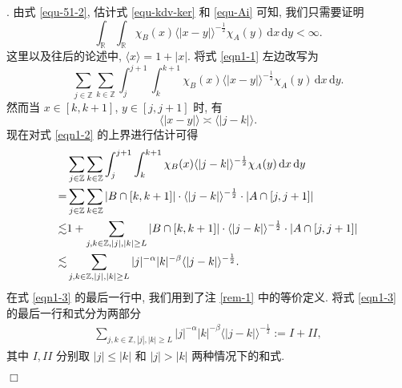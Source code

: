 \documentclass[master]{cugthesis}
\renewcommand\d{\ensuremath{\,\mathrm{d}}}
\newenvironment{proof}{{\noindent\itshape 证明}.}{\hfill $\Box$\par}
\begin{document}
\begin{proof}
由式 \eqref{equ-51-2}, 估计式 \eqref{equ-kdv-ker} 和 \eqref{equ-Ai} 可知, 我们只需要证明
    \begin{equation}
       \int_{\mathbb{R}}\int_{\mathbb{R}}\chi_B(x)\langle|x-y|\rangle^{-\frac{1}{2}}\chi_A(y)\d x\d y<\infty.\label{eqn1-1}
    \end{equation}
这里以及往后的论述中, $\langle x \rangle = 1+|x|$.
    将式 \eqref{eqn1-1} 左边改写为
    \begin{equation}
       \sum_{j\in \mathbb{Z}}\sum_{k\in\mathbb{Z}}\int_j^{j+1}\int_k^{k+1}\chi_B(x)\langle|x-y|\rangle^{-\frac{1}{2}}\chi_A(y)\d x\d y.\label{eqn1-2}
    \end{equation}
    然而当 $x\in [k,k+1]$, $y\in[j,j+1]$ 时, 有
    $$
       \langle|x-y|\rangle\asymp \langle|j-k|\rangle.
    $$
    现在对式 \eqref{eqn1-2} 的上界进行估计可得
    \begin{align}
       &\sum_{j\in \mathbb{Z}}\sum_{k\in\mathbb{Z}}\int_j^{j+1}\int_k^{k+1}\chi_B(x)\langle|j-k|\rangle^{-\frac{1}{2}}\chi_A(y)\d x\d y\notag\\
       =&\sum_{j\in\mathbb{Z}}\sum_{k\in\mathbb{Z}}|B\cap [k,k+1]|\cdot \langle|j-k|\rangle^{-\frac{1}{2}}\cdot |A\cap [j,j+1]|\notag\\
       \lesssim & 1+\sum_{j,k\in\mathbb{Z},|j|,|k|\ge L} |B\cap[k,k+1]|\cdot \langle|j-k|\rangle^{-\frac{1}{2}}\cdot|A\cap [j,j+1]|\notag\\
       \lesssim & \sum_{j,k\in\mathbb{Z},|j|,|k|\ge L} |j|^{-\alpha}|k|^{-\beta}\langle |j-k|\rangle^{-\frac{1}{2}}.\label{eqn1-3}
    \end{align}
在式 \eqref{eqn1-3} 的最后一行中, 我们用到了注 \ref{rem-1} 中的等价定义.
 将式 \eqref{eqn1-3} 的最后一行和式分为两部分
 \begin{align}\label{equ-426-10}
 \sum_{j,k\in\mathbb{Z},|j|,|k|\ge L} |j|^{-\alpha}|k|^{-\beta}\langle |j-k|\rangle^{-\frac{1}{2}}:= I+II,
 \end{align}
 其中 $I, II$ 分别取  $|j|\leq |k|$ 和 $|j|>|k|$ 两种情况下的和式.


\end{proof}
\end{document}
